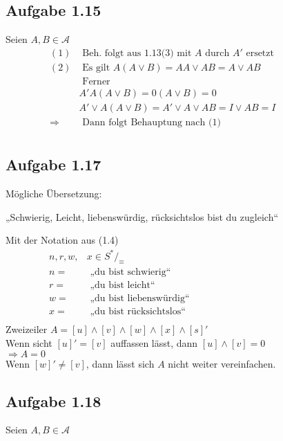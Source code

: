 \documentclass[10pt, a4paper]{article}
\begin{document}
\subsection{Aufgabe 1.15}
Seien $A,B\in\mathcal{A}$
\begin{align*}
	(1)&\text{ Beh. folgt aus 1.13(3) mit }A\text{ durch }A' \text{ ersetzt }~~~~~~~~~~~~~~~	\\
	(2)&\text{ Es gilt } A(A\vee B)=AA\vee AB=A\vee AB \\
	&\text{ Ferner }	\\
	&A'A(A\vee B)=0(A\vee B)=0	\\
	&A'\vee A(A\vee B)=A'\vee A\vee AB=I\vee AB= I	\\
	\Rightarrow&\text{ Dann folgt Behauptung nach (1) }	\\
\end{align*}

\subsection{Aufgabe 1.17}
Mögliche Übersetzung:
\begin{center}
„Schwierig, Leicht, liebenswürdig, rücksichtslos bist du zugleich“
\end{center}
Mit der Notation aus (1.4)
\begin{align*}
	n,r,w,&x\in S^{\ast}/_{\equiv}	\hspace{230pt}\\
	n=&\text{ „du bist schwierig“ }	\\
	r=&\text{ „du bist leicht“ }	\\
	w=&\text{ „du bist liebenswürdig“ }	\\
	x=&\text{ „du bist rücksichtslos“ }	\\
\end{align*}
Zweizeiler $A=[u]\wedge[v]\wedge[w]\wedge[x]\wedge[s]'$	\\
Wenn sicht $[u]'=[v]$ auffassen lässt, dann $[u]\wedge[v]=0$	\\
$\Rightarrow A=0$	\\
Wenn $[w]'\neq[v]$, dann lässt sich $A$ nicht weiter vereinfachen.


\subsection{Aufgabe 1.18}
Seien $A,B\in\mathcal{A}$
\end{document}
